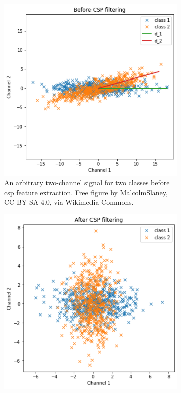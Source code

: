 \begin{figure}[t]
    \centering
    \begin{subfigure}{0.45\textwidth}
        \centering
        \includegraphics[width=\textwidth]{../images/offline/pre_csp.pdf}
        \captionsetup{width=\linewidth}
        \captionsetup{justification=centering}
        \caption{An arbitrary two-channel signal for two classes before \gls{csp} feature extraction. Free figure by MalcolmSlaney, CC BY-SA 4.0, via Wikimedia Commons.}
        \label{fig:offline_bci_system_csp_pre}
    \end{subfigure}
    \hfill
    \begin{subfigure}{0.45\textwidth}
        \centering
        \includegraphics[width=\textwidth]{../images/offline/post_csp.pdf}

\end{subfigure}
\end{figure}
